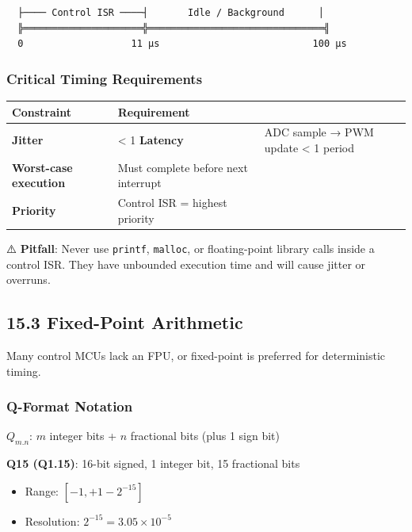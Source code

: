 \documentclass[11pt,a4paper]{book}
\begin{document}
\begin{itemize}
\begin{lstlisting}
  ├──── Control ISR ────┤       Idle / Background      │
  ╠═════════════════════╬═══════════════════════════════╣
  0                   11 µs                           100 µs
\end{lstlisting}

\subsubsection{Critical Timing Requirements}

\begin{center}
\begin{tabular}{|l|l|}
\hline
Constraint & Requirement \\
\hline
\textbf{Jitter} & < 1%
\textbf{Latency} & ADC sample → PWM update < 1 period \\
\textbf{Worst-case execution} & Must complete before next interrupt \\
\textbf{Priority} & Control ISR = highest priority \\
\hline
\end{tabular}
\end{center}

⚠️ \textbf{Pitfall}: Never use \texttt{printf}, \texttt{malloc}, or floating-point library calls inside a control ISR. They have unbounded execution time and will cause jitter or overruns.

\medskip\noindent\hrulefill\medskip

\subsection{15.3 Fixed-Point Arithmetic}

Many control MCUs lack an FPU, or fixed-point is preferred for deterministic timing.

\subsubsection{Q-Format Notation}

$Q_{m.n}$: $m$ integer bits + $n$ fractional bits (plus 1 sign bit)

\textbf{Q15 (Q1.15)}: 16-bit signed, 1 integer bit, 15 fractional bits
\begin{itemize}
\item Range: $[-1, +1 - 2^{-15}]$
\item Resolution: $2^{-15} = 3.05 \times 10^{-5}$
\end{itemize}


\end{itemize}
\end{document}
